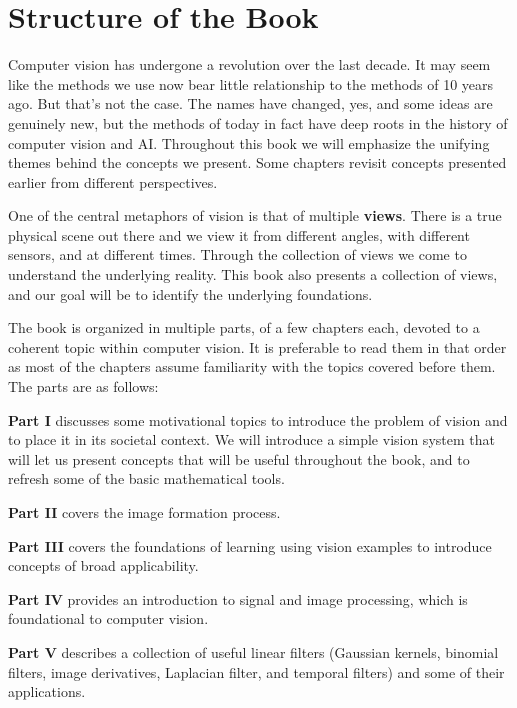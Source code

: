 
\section*{Structure of the Book}

Computer vision has undergone a revolution over the last decade. It may seem like the methods we use now bear little relationship to the methods of 10 years ago. But that's not the case. The names have changed, yes, and some ideas are genuinely new, but the methods of today in fact have deep roots in the history of computer vision and AI. Throughout this book we will emphasize the unifying themes behind the concepts we present. Some chapters revisit concepts presented earlier from different perspectives.

One of the central metaphors of vision is that of multiple {\bf views}. There is a true physical scene out there and we view it from different angles, with different sensors, and at different times. Through the collection of views we come to understand the underlying reality. This book also presents a collection of views, and our goal will be to identify the underlying foundations. 

The book is organized in multiple parts, of a few chapters each, devoted to a coherent topic within computer vision. It is preferable to read them in that order as most of the chapters assume familiarity with the topics covered before them. The parts are as follows:

{\bf Part I} discusses some motivational topics to introduce the problem of vision and to place it in its societal context. We will introduce a simple vision system that will let us present concepts that will be useful throughout the book, and to refresh some of the basic mathematical tools. 

{\bf Part II} covers the image formation  process. 

{\bf Part III} covers the foundations of learning using vision examples to introduce concepts of broad applicability. 

{\bf Part IV} provides an introduction to signal and image processing, which is foundational to computer vision. 

{\bf Part V} describes a collection of useful linear filters (Gaussian kernels, binomial filters, image derivatives, Laplacian filter, and temporal filters) and some of their applications. 

